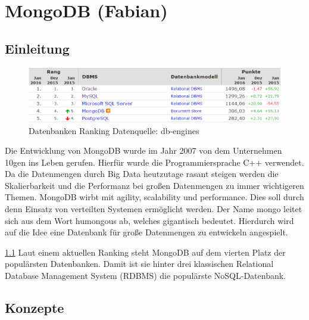 \chapter{MongoDB (Fabian)}\label{mongodb-fabian}

\section{Einleitung}\label{einleitung}

\begin{figure}[t]
	\centering
	\includegraphics[width=0.7\linewidth]{figures/db-ranking.png}
	\caption{Datenbanken Ranking Datenquelle: db-engines \cite{db-engines:mongodb}}
	\label{f:mongodb:ranking}
\end{figure}

Die Entwicklung von MongoDB wurde im Jahr 2007 von dem Unternehmen 10gen
ins Leben gerufen. Hierfür wurde die Programmiersprache C++ verwendet.
Da die Datenmengen durch Big Data heutzutage rasant steigen
werden die Skalierbarkeit und die Performanz bei großen Datenmengen zu
immer wichtigeren Themen. MongoDB wirbt mit agility, scalability und
performance. Dies soll durch denn Einsatz von verteilten Systemen
ermöglicht werden. Der Name mongo leitet sich aus dem Wort humongous ab,
welches gigantisch bedeutet. Hierdurch wird auf die Idee eine Datenbank
für große Datenmengen zu entwickeln angespielt.

\ref{f:mongodb:ranking}
Laut einem aktuellen Ranking steht MongoDB auf dem
vierten Platz der populärsten Datenbanken. Damit ist sie hinter drei
klassischen Relational Database Management System (RDBMS) die populärste
NoSQL-Datenbank.

\section{Konzepte}\label{konzepte}


